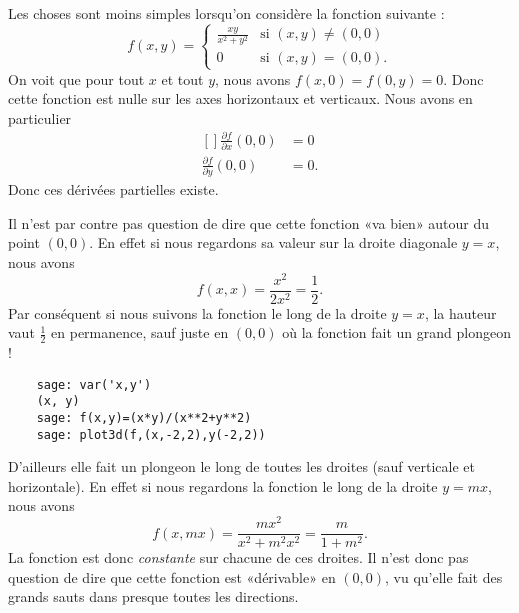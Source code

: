 \begin{example}
    Les choses sont moins simples lorsqu'on considère la fonction suivante :
    \begin{equation}
        f(x,y)=\begin{cases}
            \frac{ xy }{ x^2+y^2 }    &   \text{si $(x,y)\neq(0,0)$}\\
            0    &    \text{si $(x,y)=(0,0)$}.
        \end{cases}
    \end{equation}
    On voit que pour tout $x$ et tout $y$, nous avons $f(x,0)=f(0,y)=0$. Donc cette fonction est nulle sur les axes horizontaux et verticaux. Nous avons en particulier
    \begin{equation}
        \begin{aligned}[]
            \frac{ \partial f }{ \partial x }(0,0)&=0\\
            \frac{ \partial f }{ \partial y }(0,0)&=0.
        \end{aligned}
    \end{equation}
    Donc ces dérivées partielles existe.

    Il n'est par contre pas question de dire que cette fonction «va bien» autour du point $(0,0)$. En effet si nous regardons sa valeur sur la droite diagonale $y=x$, nous avons
    \begin{equation}
        f(x,x)=\frac{ x^2 }{ 2x^2 }=\frac{ 1 }{2}.
    \end{equation}
    Par conséquent si nous suivons la fonction le long de la droite $y=x$, la hauteur vaut $\frac{ 1 }{2}$ en permanence, sauf juste en $(0,0)$ où la fonction fait un grand plongeon !
    \begin{verbatim}
    sage: var('x,y')
    (x, y)
    sage: f(x,y)=(x*y)/(x**2+y**2)
    sage: plot3d(f,(x,-2,2),y(-2,2))
    \end{verbatim}

    D'ailleurs elle fait un plongeon le long de toutes les droites (sauf verticale et horizontale). En effet si nous regardons la fonction le long de la droite $y=mx$, nous avons
    \begin{equation}
        f(x,mx)=\frac{ mx^2 }{ x^2+m^2x^2 }=\frac{ m }{ 1+m^2 }.
    \end{equation}
    La fonction est donc \emph{constante} sur chacune de ces droites. Il n'est donc pas question de dire que cette fonction est «dérivable» en $(0,0)$, vu qu'elle fait des grands sauts dans presque toutes les directions.
\end{example}

